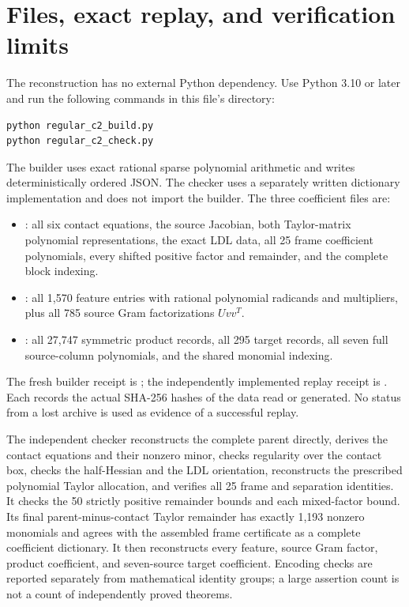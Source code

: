 \documentclass[11pt]{article}
\theoremstyle{definition}
\begin{document}
\section{Files, exact replay, and verification limits}

The reconstruction has no external Python dependency. Use Python 3.10 or
later and run the following commands in this file's directory:
\begin{verbatim}
python regular_c2_build.py
python regular_c2_check.py
\end{verbatim}
The builder uses exact rational sparse polynomial arithmetic and writes
deterministically ordered JSON. The checker uses a separately written
dictionary implementation and does not import the builder. The three
coefficient files are:
\begin{itemize}
 \item {}: all six contact equations, the source
 Jacobian, both Taylor-matrix polynomial representations, the exact LDL data,
 all 25 frame coefficient polynomials, every shifted positive factor and
 remainder, and the complete block indexing.
 \item {}: all 1,570 feature entries with
 rational polynomial radicands and multipliers, plus all 785 source Gram
 factorizations $Uvv^T$.
 \item {}: all 27,747 symmetric product
 records, all 295 target records, all seven full source-column polynomials,
 and the shared monomial indexing.
\end{itemize}
The fresh builder receipt is
; the independently implemented replay
receipt is . Each records the
actual SHA-256 hashes of the data read or generated. No status from a lost
archive is used as evidence of a successful replay.

The independent checker reconstructs the complete parent directly, derives
the contact equations and their nonzero minor, checks regularity over the
contact box, checks the half-Hessian and the LDL orientation, reconstructs
the prescribed polynomial Taylor allocation, and verifies all 25 frame and
separation identities. It checks the 50 strictly positive remainder bounds
and each mixed-factor bound. Its final parent-minus-contact Taylor remainder
has exactly 1,193 nonzero monomials and agrees with the assembled frame
certificate as a complete coefficient dictionary. It then reconstructs every
feature, source Gram factor, product coefficient, and seven-source target
coefficient. Encoding checks are reported separately from mathematical identity
groups; a large assertion count is not a count of independently proved
theorems.
\end{document}
